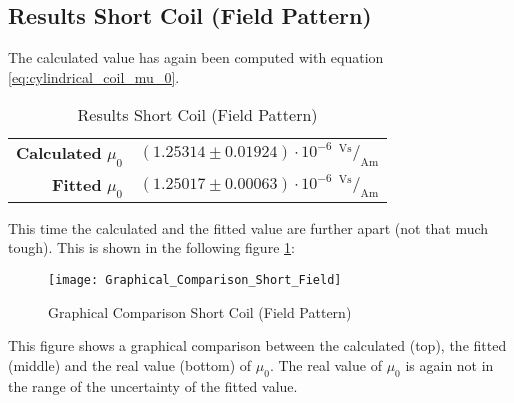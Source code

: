 \subsection{Results Short Coil (Field Pattern)}
\label{subsec:Results_Short_Coil_Field}
The calculated value has again been computed with equation \ref{eq:cylindrical_coil_mu_0}.
\begin{table}[H]
	\centering
	\renewcommand{\arraystretch}{1.3}
	\begin{tabular}{r l}
		\hline
		\textbf{Calculated} $\mu_0$ & $(1.25314\pm0.01924)\cdot10^{-6}\ \,^\text{Vs}\!/_\text{Am}$ \\
		\textbf{Fitted} $\mu_0$ & $(1.25017\pm0.00063)\cdot10^{-6}\ \,^\text{Vs}\!/_\text{Am}$ \\ \hline
	\end{tabular}
	\caption{Results Short Coil (Field Pattern)}
	\label{tab:Results_Short_Coil_Field}
\end{table}
This time the calculated and the fitted value are further apart (not that much tough). This is shown in the following figure \ref{fig:Graphical_Comparison_Short_Field}:
\begin{figure}[H]
	\centering
	\texttt{[image: Graphical\_Comparison\_Short\_Field]}
	\caption{Graphical Comparison Short Coil (Field Pattern)}
	\label{fig:Graphical_Comparison_Short_Field}
\end{figure}
This figure shows a graphical comparison between the calculated (top), the fitted (middle) and the real value (bottom) of $\mu_0$. The real value of $\mu_0$ is again not in the range of the uncertainty of the fitted value.

